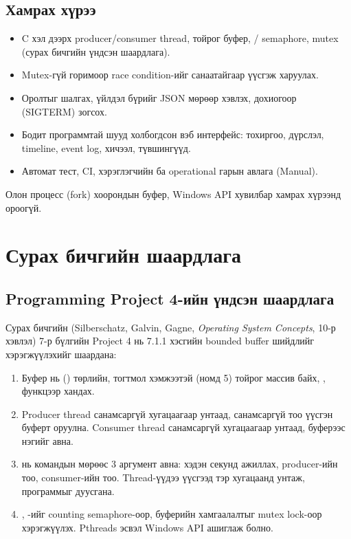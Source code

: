 \documentclass[12pt,a4paper]{article}
\begin{document}
\subsection{Хамрах хүрээ}
\begin{itemize}
  \item C хэл дээрх producer/consumer thread, тойрог буфер, / semaphore, mutex (сурах бичгийн үндсэн шаардлага).
  \item Mutex-гүй горимоор race condition-ийг санаатайгаар үүсгэж харуулах.
  \item Оролтыг шалгах, үйлдэл бүрийг JSON мөрөөр хэвлэх, дохиогоор (SIGTERM) зогсох.
  \item Бодит программтай шууд холбогдсон вэб интерфейс: тохиргоо, дүрслэл, timeline, event log, хичээл, түвшингүүд.
  \item Автомат тест, CI, хэрэглэгчийн ба operational гарын авлага (Manual).
\end{itemize}
Олон процесс (fork) хоорондын буфер, Windows API хувилбар хамрах хүрээнд ороогүй.

\section{Сурах бичгийн шаардлага}

\subsection{Programming Project 4-ийн үндсэн шаардлага}
Сурах бичгийн (Silberschatz, Galvin, Gagne, \textit{Operating System Concepts}, 10-р хэвлэл) 7-р бүлгийн Project 4 нь 7.1.1 хэсгийн bounded buffer шийдлийг хэрэгжүүлэхийг шаардана:
\begin{enumerate}
  \item Буфер нь  () төрлийн, тогтмол хэмжээтэй (номд 5) тойрог массив байх, ,  функцээр хандах.
  \item Producer thread санамсаргүй хугацаагаар унтаад, санамсаргүй тоо үүсгэн буферт оруулна. Consumer thread санамсаргүй хугацаагаар унтаад, буферээс нэгийг авна.
  \item {} нь командын мөрөөс 3 аргумент авна: хэдэн секунд ажиллах, producer-ийн тоо, consumer-ийн тоо. Thread-үүдээ үүсгээд тэр хугацаанд унтаж, программыг дуусгана.
  \item {}, -ийг counting semaphore-оор, буферийн хамгаалалтыг mutex lock-оор хэрэгжүүлэх. Pthreads эсвэл Windows API ашиглаж болно.
\end{enumerate}
\end{document}
